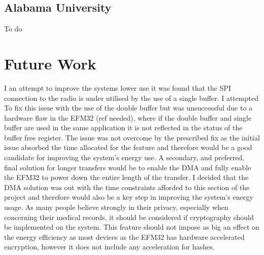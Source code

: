 \subsection{Alabama University}
To do

\section{Future Work}
I an attempt to improve the systems lower use it was found that the SPI connection to the radio is
under utilised by the use of a single buffer. I attempted To fix this issue with the use of the double
buffer but was unsuccessful due to a hardware flaw in the EFM32 (ref needed), where if the double
buffer and single buffer are used in the same application it is not reflected in the status of the buffer
free register. The issue was not overcome by the prescribed fix as the initial issue absorbed the time
allocated for the feature and therefore would be a good candidate for improving the system’s
energy use. A secondary, and preferred, final solution for longer transfers would be to enable the
DMA and fully enable the EFM32 to power down the entire length of the transfer. I decided that the
DMA solution was out with the time constraints afforded to this section of the project and therefore
would also be a key step in improving the system’s energy usage.
As many people believe strongly in their privacy, especially when concerning their medical records, it
should be considered if cryptography should be implemented on the system. This feature should not
impose as big an effect on the energy efficiency as most devices as the EFM32 has hardware
accelerated encryption, however it does not include any acceleration for hashes.


